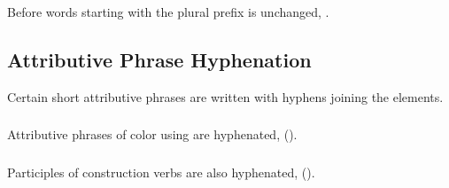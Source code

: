 \subsubsection{} Before words starting with  the plural prefix
 is unchanged, .

\subsection{Attributive Phrase Hyphenation} Certain short attributive
phrases are written with hy\-phens joining the elements.

\subsubsection{} Attributive phrases of color using  
are hyphenated,   ().

\subsubsection{} Participles of  construction verbs are also
hyphenated,  
().

